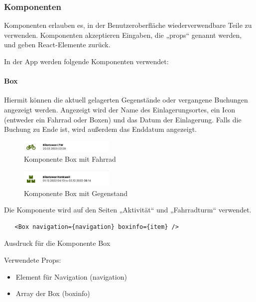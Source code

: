 \subsubsection{Komponenten}
Komponenten erlauben es, in der Benutzeroberfläche wiederverwendbare Teile zu verwenden. Komponenten akzeptieren Eingaben, die „props“ genannt werden, und geben React-Elemente zurück. 

\bigskip

\noindent In der App werden folgende Komponenten verwendet:

\paragraph{Box}

Hiermit können die aktuell gelagerten Gegenstände oder vergangene Buchungen angezeigt werden. Angezeigt wird der Name des Einlagerungsortes, ein Icon (entweder ein Fahrrad oder Boxen) und das Datum der Einlagerung. Falls die Buchung zu Ende ist, wird außerdem das Enddatum angezeigt.

\begin{figure}[H]
  \centering
  \includegraphics[width=0.4\textwidth]{images/app-screenshots/boxwithbike.png}
  \caption{Komponente Box mit Fahrrad}
  \label{fig:boxwithbike}
\end{figure}
\begin{figure}[H]
  \centering
  \includegraphics[width=0.4\textwidth]{images/app-screenshots/boxwithitem.png}
  \caption{Komponente Box mit Gegenstand}
  \label{fig:boxwithitem}
\end{figure}

Die Komponente wird auf den Seiten „Aktivität“ und „Fahrradturm“ verwendet.

\begin{listing}[H]
  \begin{verbatim}
   <Box navigation={navigation} boxinfo={item} />
\end{verbatim}
  \caption{Ausdruck für die Komponente Box}
  \label{lst:jsxbox}
\end{listing}

Verwendete Props:
\begin{itemize}
  \item Element für Navigation (navigation)
  \item \Gls{Array} der Box (boxinfo)
\end{itemize}

